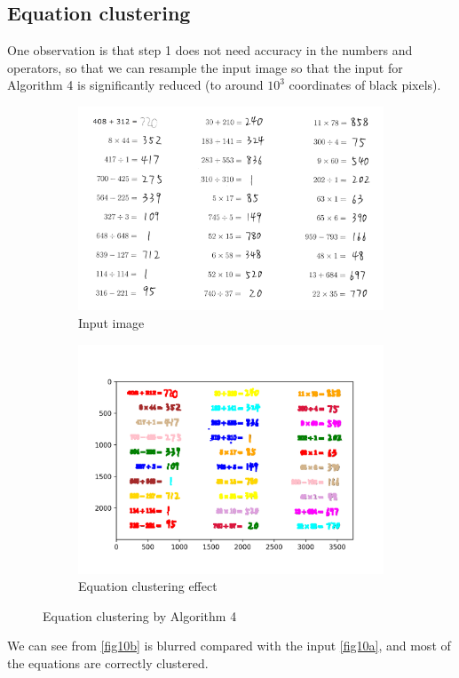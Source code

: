 \subsection{Equation clustering}
One observation is that step 1 does not need accuracy in the numbers and operators, so that we can resample the input image so that the input for Algorithm 4 is significantly reduced (to around \(10^3\) coordinates of black pixels).
\begin{figure}[htbp]
    \vspace{-1em}
    \centering
    \begin{subfigure}[t]{0.45\textwidth}
        \includegraphics[width=\textwidth]{../TestSamplePictures/test1.png}
        \caption{Input image}\label{fig10a}		
    \end{subfigure}
    \begin{subfigure}[t]{0.54\textwidth}
        \includegraphics[width=\textwidth]{../TestSamplePictures/test_result.png}
        \caption{Equation clustering effect}\label{fig10b}
    \end{subfigure}
    \caption{Equation clustering by Algorithm 4}\label{fig10}
\end{figure}
We can see from \autoref{fig10b} is blurred compared with the input \autoref{fig10a}, and most of the equations are correctly clustered.

